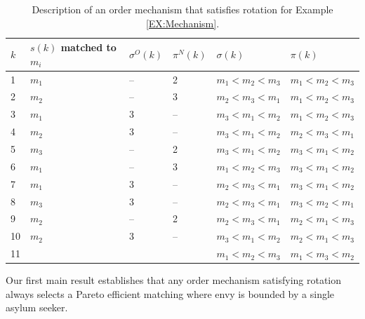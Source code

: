 \documentclass[12pt,fleqn]{article}
\begin{document}
\begin{table}[h!]
\caption{Description of an order mechanism that satisfies rotation for Example \ref{EX:Mechanism}.}\label{TABLE:Mechanism}
\begin{tabular}{llllll}\hline
$k$ & $s(k)$ matched to $m_i$ & $\sigma^O(k)$ & $\pi^N(k)$ & $\sigma(k)$ & $\pi(k)$ \\ \hline
1   & $m_1$ & -- & 2 & $m_1<m_2<m_3$ & $m_1<m_2<m_3$ \\
2   & $m_2$ & -- & 3 & $m_2<m_3<m_1$ & $m_1<m_2<m_3$ \\
3   & $m_1$ & 3 & -- & $m_3<m_1<m_2$ & $m_1<m_2<m_3$ \\
4   & $m_2$ & 3 & -- & $m_3<m_1<m_2$ & $m_2<m_3<m_1$ \\
5   & $m_3$ & -- & 2 & $m_3<m_1<m_2$ & $m_3<m_1<m_2$ \\
6   & $m_1$ & -- & 3 & $m_1<m_2<m_3$ & $m_3<m_1<m_2$ \\
7   & $m_1$ & 3 & -- & $m_2<m_3<m_1$ & $m_3<m_1<m_2$ \\
8   & $m_3$ & 3 & -- & $m_2<m_3<m_1$ & $m_3<m_2<m_1$ \\
9   & $m_2$ & -- & 2 & $m_2<m_3<m_1$ & $m_2<m_1<m_3$ \\
10  & $m_2$ & 3 & -- & $m_3<m_1<m_2$ & $m_2<m_1<m_3$ \\
11  &       &   &    & $m_1<m_2<m_3$ & $m_1<m_3<m_2$ \\ \hline
\end{tabular}
\end{table}

\noindent Our first main result establishes that any order mechanism satisfying rotation always selects a Pareto efficient matching where envy is bounded by a single asylum seeker.
\end{document}
